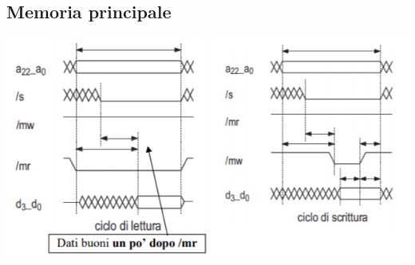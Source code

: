 \documentclass[11pt]{report}
\begin{document}
\subsection{Memoria principale}
\begin{center}
\includegraphics{img/231.PNG}
\end{center}
\end{document}
